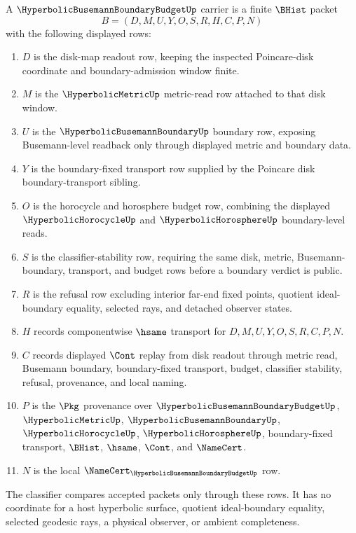\begin{definition}
\label{def:hyperbolic-busemann-boundary-budget-carrier}
A $\HyperbolicBusemannBoundaryBudgetUp$ carrier is a finite $\BHist$ packet
$$
B=(D,M,U,Y,O,S,R,H,C,P,N)
$$
with the following displayed rows:
\begin{enumerate}
\item $D$ is the disk-map readout row, keeping the inspected Poincare-disk coordinate and boundary-admission window finite.
\item $M$ is the $\HyperbolicMetricUp$ metric-read row attached to that disk window.
\item $U$ is the $\HyperbolicBusemannBoundaryUp$ boundary row, exposing Busemann-level readback only through displayed metric and boundary data.
\item $Y$ is the boundary-fixed transport row supplied by the Poincare disk boundary-transport sibling.
\item $O$ is the horocycle and horosphere budget row, combining the displayed $\HyperbolicHorocycleUp$ and $\HyperbolicHorosphereUp$ boundary-level reads.
\item $S$ is the classifier-stability row, requiring the same disk, metric, Busemann-boundary, transport, and budget rows before a boundary verdict is public.
\item $R$ is the refusal row excluding interior far-end fixed points, quotient ideal-boundary equality, selected rays, and detached observer states.
\item $H$ records componentwise $\hsame$ transport for $D,M,U,Y,O,S,R,C,P,N$.
\item $C$ records displayed $\Cont$ replay from disk readout through metric read, Busemann boundary, boundary-fixed transport, budget, classifier stability, refusal, provenance, and local naming.
\item $P$ is the $\Pkg$ provenance over $\HyperbolicBusemannBoundaryBudgetUp$, $\HyperbolicMetricUp$, $\HyperbolicBusemannBoundaryUp$, $\HyperbolicHorocycleUp$, $\HyperbolicHorosphereUp$, boundary-fixed transport, $\BHist$, $\hsame$, $\Cont$, and $\NameCert$.
\item $N$ is the local $\NameCert_{\HyperbolicBusemannBoundaryBudgetUp}$ row.
\end{enumerate}
The classifier compares accepted packets only through these rows. It has no coordinate for a host hyperbolic surface, quotient ideal-boundary equality, selected geodesic rays, a physical observer, or ambient completeness.
\end{definition}

